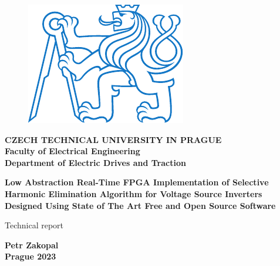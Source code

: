 \documentclass[a4paper, twoside, 11pt]{article}
\begin{document}
\setcounter{figure}{0}

\begin{titlepage}
	\begin{center}

\begin{figure}[H]
	\begin{center}
		\includegraphics[scale=1]{src/misc/symbol_cvut_konturova_verze.pdf}
	\end{center}
\end{figure}
	{\Large{\textbf{CZECH TECHNICAL UNIVERSITY IN PRAGUE}}}\\
	{\textbf{Faculty of Electrical Engineering}}\\
	{\textbf{Department of Electric Drives and Traction}}
	
	\vspace{3cm}
	
	
	{\Large\textbf{Low Abstraction Real-Time FPGA Implementation of Selective Harmonic Elimination Algorithm for Voltage Source Inverters Designed Using State of The Art Free and Open Source Software}}
	
	\vspace{1cm}
	
	
	
	Technical report\\
	
	\end{center}
	
	\vspace{3cm}
	
	
	\vspace{0.5cm}
	
	\vfill
	
\begin{center}

	\large{\textbf{Petr Zakopal}}\\
	\large{\textbf{Prague 2023}}
	\end{center}
\end{titlepage}
\end{document}
